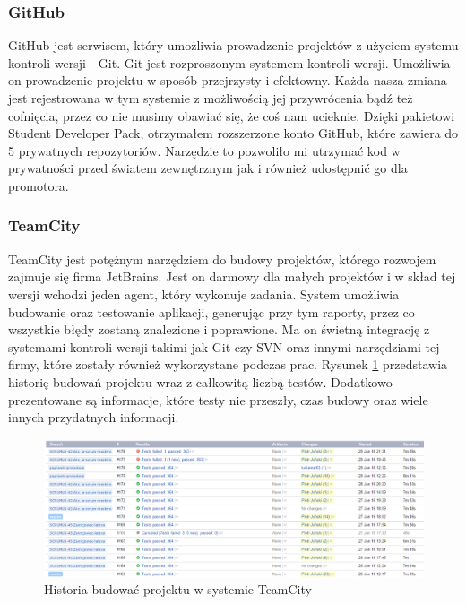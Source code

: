 \subsubsection{GitHub}
GitHub jest serwisem, który umożliwia prowadzenie projektów z użyciem systemu kontroli wersji - Git. Git jest rozproszonym systemem kontroli wersji. Umożliwia on prowadzenie projektu w sposób przejrzysty i efektowny. Każda nasza zmiana jest rejestrowana w tym systemie z możliwością jej przywrócenia bądź też cofnięcia, przez co nie musimy obawiać się, że coś nam ucieknie. Dzięki pakietowi Student Developer Pack, otrzymałem rozszerzone konto GitHub, które zawiera do 5 prywatnych repozytoriów. Narzędzie to pozwoliło mi utrzymać kod w prywatności przed światem zewnętrznym jak i również udostępnić go dla promotora.


\subsubsection{TeamCity}
TeamCity jest potężnym narzędziem do budowy projektów, którego rozwojem zajmuje się firma JetBrains. Jest on darmowy dla małych projektów i w skład tej wersji wchodzi jeden agent, który wykonuje zadania. System umożliwia budowanie oraz testowanie aplikacji, generując przy tym raporty, przez co wszystkie błędy zostaną znalezione i poprawione. Ma on świetną integrację z systemami kontroli wersji takimi jak Git czy SVN oraz innymi narzędziami tej firmy, które zostały również wykorzystane podczas prac. Rysunek \ref{fig:teamcity} przedstawia historię budowań projektu wraz z całkowitą liczbą testów. Dodatkowo prezentowane są informacje, które testy nie przeszły, czas budowy oraz wiele innych przydatnych informacji.

\begin{figure}[h!]
	\centering
	\includegraphics[width=15cm]{rysunki/screenshot_teamcity.png}	
	\caption{Historia budować projektu w systemie TeamCity}
	\label{fig:teamcity}
\end{figure}


